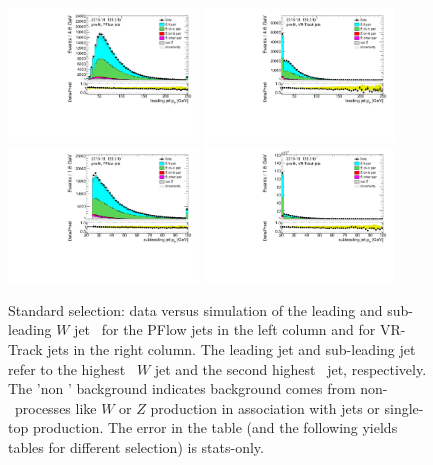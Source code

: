 \documentclass[letterpaper,12pt]{article}
\begin{document}
\begin{figure}[H]
	\centering
	\includegraphics[width=0.45\textwidth]{FTAG_plots/pretagNoRwwithouthighpTPFlowall/DataMC_h_J0_pt.pdf}
	\includegraphics[width=0.45\textwidth]{FTAG_plots/pretagNoRwwithouthighpTVRJetsall/DataMC_h_J0_pttrackjet.pdf}\\
	\includegraphics[width=0.45\textwidth]{FTAG_plots/pretagNoRwwithouthighpTPFlowall/DataMC_h_J1_pt.pdf}
	\includegraphics[width=0.45\textwidth]{FTAG_plots/pretagNoRwwithouthighpTVRJetsall/DataMC_h_J1_pttrackjet.pdf}\\
	\caption{Standard selection: data versus simulation of the leading and sub-leading $W$ jet \pt\ 
	for the PFlow jets in the left column and for VR-Track jets in the right column. 
	The leading jet and sub-leading jet refer to the highest \pt\ $W$ jet and the 
	second highest \pt\ jet, respectively. The 'non \ttbar' background 
	indicates background comes from non-\ttbar\ processes like $W$ or $Z$ production
	in association with jets or single-top production.
	The error in the table (and the following yields tables for
	different selection) is stats-only. }
	\label{fig:kinematic_distributions_standard}
\end{figure}
\end{document}
